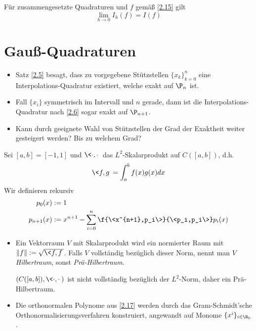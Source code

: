 \documentclass[11pt]{scrbook}
\begin{document}
\begin{kor}[Konvergenz]
	\label{2.16}
	Für zusammengesetzte Quadraturen und $f$ gemäß \ref{2.15} gilt
	\[
		\lim_{h \to 0} I_h(f) = I(f)
	\]
\end{kor}

\section{Gauß-Quadraturen}

\begin{itemize}
	\item
		Satz \ref{2.5} besagt, dass zu vorgegebene Stützstellen $\{x_k\}_{k=0}^n$ eine Interpolations-Quadratur existiert, welche exakt auf $\P_n$ ist.
	\item
		Fall $\{x_i\}$ symmetrisch im Intervall und $n$ gerade, dann ist die Interpolations-Quadratur nach \ref{2.6} sogar exakt auf $\P_{n+1}$.
	\item
		Kann durch geeignete Wahl von Stützstellen der Grad der Exaktheit weiter gesteigert werden? Bis zu welchem Grad?
\end{itemize}

\begin{df}
	\label{2.17}	
	Sei $[a,b] = [-1,1]$ und $\<\cdot, \cdot\>$ das $L^2$-Skalarprodukt auf $C([a,b])$, d.h.
	\[
		\<f,g\> = \int_a^b f(x)g(x) dx
	\]
	Wir definieren rekursiv
	\begin{align*}
		p_0(x) &:= 1 \\
		p_{n+1}(x) &:= x^{n+1}- \sum_{i=0}^n \f {\<x^{n+1},p_i\>}{\<p_i,p_i\>} p_i(x)
	\end{align*}
	\begin{note}
		\begin{itemize}
			\item
				Ein Vektorraum $V$ mit Skalarprodukt wird ein normierter Raum mit $\|f\| := \sqrt{\<f,f\>}$.
				Falls $V$ vollständig bezüglich dieser Norm, nennt man $V$ \emph{Hilbertraum}, sonst \emph{Prä-Hilbertraum}.

				$(C([a,b]),\<\cdot,\cdot\>)$ ist nicht vollständig bezüglich der $L^2$-Norm, daher ein Prä-Hilbertraum.
			\item
				Die orthonormalen Polynome aus \ref{2.17} werden durch das Gram-Schmidt'sche Orthonormalisierungsverfahren konstruiert, angewandt auf Monome $\{x^i\}_{i\in \N_0}$.

		\end{itemize}
	\end{note}
\end{df}
\end{document}
